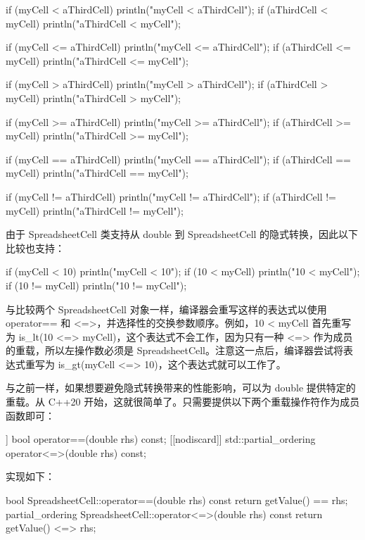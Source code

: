 \begin{cpp}
if (myCell < aThirdCell) { println("myCell < aThirdCell"); }
if (aThirdCell < myCell) { println("aThirdCell < myCell"); }

if (myCell <= aThirdCell) { println("myCell <= aThirdCell"); }
if (aThirdCell <= myCell) { println("aThirdCell <= myCell"); }

if (myCell > aThirdCell) { println("myCell > aThirdCell"); }
if (aThirdCell > myCell) { println("aThirdCell > myCell"); }

if (myCell >= aThirdCell) { println("myCell >= aThirdCell"); }
if (aThirdCell >= myCell) { println("aThirdCell >= myCell"); }

if (myCell == aThirdCell) { println("myCell == aThirdCell"); }
if (aThirdCell == myCell) { println("aThirdCell == myCell"); }

if (myCell != aThirdCell) { println("myCell != aThirdCell"); }
if (aThirdCell != myCell) { println("aThirdCell != myCell"); }
\end{cpp}

由于 SpreadsheetCell 类支持从 double 到 SpreadsheetCell 的隐式转换，因此以下比较也支持：

\begin{cpp}
if (myCell < 10) { println("myCell < 10"); }
if (10 < myCell) { println("10 < myCell"); }
if (10 != myCell) { println("10 != myCell"); }
\end{cpp}

与比较两个 SpreadsheetCell 对象一样，编译器会重写这样的表达式以使用 operator== 和 <=>，并选择性的交换参数顺序。例如，10 < myCell 首先重写为 is\_lt(10 <=> myCell)，这个表达式不会工作，因为只有一种 <=> 作为成员的重载，所以左操作数必须是 SpreadsheetCell。注意这一点后，编译器尝试将表达式重写为 is\_gt(myCell <=> 10)，这个表达式就可以工作了。

与之前一样，如果想要避免隐式转换带来的性能影响，可以为 double 提供特定的重载。从 C++20 开始，这就很简单了。只需要提供以下两个重载操作符作为成员函数即可：

\begin{cpp}
[[nodiscard]] bool operator==(double rhs) const;
[[nodiscard]] std::partial_ordering operator<=>(double rhs) const;
\end{cpp}

实现如下：

\begin{cpp}
bool SpreadsheetCell::operator==(double rhs) const
{
    return getValue() == rhs;
}
partial_ordering SpreadsheetCell::operator<=>(double rhs) const
{
    return getValue() <=> rhs;
}
\end{cpp}

